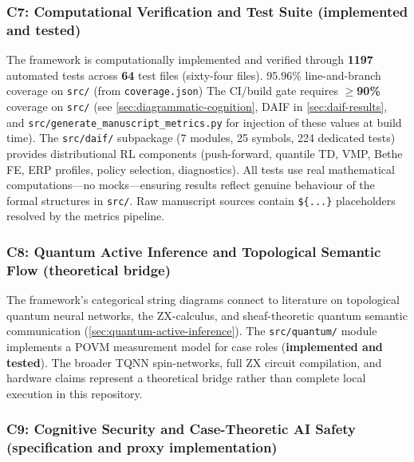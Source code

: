 \documentclass[
]{article}
\begin{document}
\subsubsection{\texorpdfstring{C7: Computational Verification and Test
Suite (\textbf{implemented and
tested})}{C7: Computational Verification and Test Suite (implemented and tested)}}\label{c7-computational-verification-and-test-suite-implemented-and-tested}

The framework is computationally implemented and verified through
\textbf{1197} automated tests across \textbf{64} test files (sixty-four
files). 95.96\% line-and-branch coverage on \texttt{src/} (from
\texttt{coverage.json}) The CI/build gate requires \textbf{\texorpdfstring{\ensuremath{\geq}}{>=}90\%}
coverage on \texttt{src/} (see \autoref{sec:diagrammatic-cognition},
DAIF in \autoref{sec:daif-results}, and
\texttt{src/generate\_manuscript\_metrics.py} for injection of these
values at build time). The \texttt{src/daif/} subpackage (7 modules, 25
symbols, 224 dedicated tests) provides distributional RL components
(push-forward, quantile TD, VMP, Bethe FE, ERP profiles, policy
selection, diagnostics). All tests use real mathematical
computations---no mocks---ensuring results reflect genuine behaviour of
the formal structures in \texttt{src/}. Raw manuscript sources contain
\texttt{\$\{...\}} placeholders resolved by the metrics pipeline.

\subsubsection{\texorpdfstring{C8: Quantum Active Inference and
Topological Semantic Flow (\textbf{theoretical
bridge})}{C8: Quantum Active Inference and Topological Semantic Flow (theoretical bridge)}}\label{c8-quantum-active-inference-and-topological-semantic-flow-theoretical-bridge}

The framework's categorical string diagrams connect to literature on
topological quantum neural networks, the ZX-calculus, and
sheaf-theoretic quantum semantic communication
(\autoref{sec:quantum-active-inference}). The \texttt{src/quantum/}
module implements a POVM measurement model for case roles
(\textbf{implemented and tested}). The broader TQNN spin-networks, full
ZX circuit compilation, and hardware claims represent a theoretical
bridge rather than complete local execution in this repository.

\subsubsection{\texorpdfstring{C9: Cognitive Security and Case-Theoretic
AI Safety (\textbf{specification and proxy
implementation})}{C9: Cognitive Security and Case-Theoretic AI Safety (specification and proxy implementation)}}\label{c9-cognitive-security-and-case-theoretic-ai-safety-specification-and-proxy-implementation}
\end{document}
